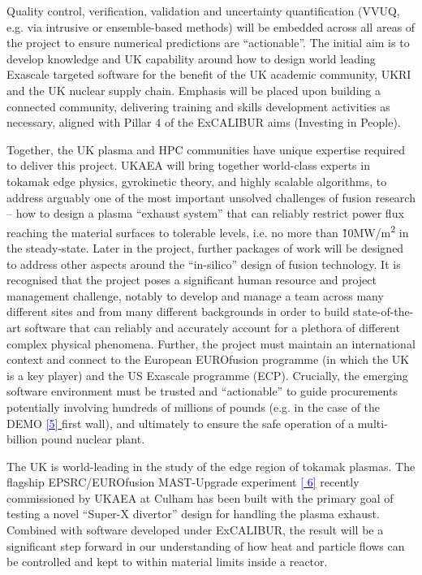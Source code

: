 \documentclass[a4paper]{article}
\newcommand\textstyleInternetlink[1]{\textcolor{blue}{#1}}
\begin{document}
\bigskip

{Quality control, verification, validation and uncertainty quantification 
(VVUQ, e.g. via intrusive or
ensemble-based methods) will be embedded across all areas of the project to 
ensure numerical predictions are
``actionable''. The initial aim is to develop knowledge and UK capability 
around how to design world leading Exascale
targeted software for the benefit of the UK academic community, UKRI and the UK 
nuclear supply chain. Emphasis will be
placed upon building a connected community, delivering training and skills 
development activities as necessary, aligned
with Pillar 4 of the ExCALIBUR aims (Investing in People).}


\bigskip

Together, the UK plasma and HPC communities have unique expertise required to 
deliver this project. UKAEA will bring
together world-class experts in tokamak edge physics, gyrokinetic theory, and 
highly scalable algorithms, to address
arguably one of the most important unsolved challenges of fusion research -- 
how to design a plasma ``exhaust system''
that can reliably restrict power flux reaching the material surfaces to 
tolerable levels, i.e. no more than
\~10MW/m\textsuperscript{2} in the steady-state. Later in the project, 
further packages of work will be designed to
address other aspects around the ``in-silico'' design of fusion technology. It 
is recognised that the project poses a
significant human resource and project management challenge, notably to develop 
and manage a team across many different
sites and from many different backgrounds in order to build state-of-the-art 
software that can reliably and accurately
account for a plethora of different complex physical phenomena. Further, the 
project must maintain an international
context and connect to the European EUROfusion programme (in which the UK is a 
key player) and the US Exascale
programme (ECP). Crucially, the emerging software environment must be trusted 
and ``actionable'' to guide procurements
potentially involving hundreds of millions of pounds (e.g. in the case of the 
{DEMO
}\href{https://www.euro-fusion.org/programme/demo/}{\textstyleInternetlink{{[5]}
}}{
first wall}), and ultimately to ensure the safe operation of a multi-billion 
pound nuclear plant.


\bigskip

The UK is world-leading in the study of the edge region of tokamak plasmas. The 
flagship EPSRC/EUROfusion MAST-Upgrade
{experiment
}\href{https://reuters.screenocean.com/record/1366443}{\textstyleInternetlink{{[
6]}}}{
recently }commissioned by UKAEA at Culham has been built with the primary goal 
of testing a novel ``Super-X divertor''
design for handling the plasma exhaust. Combined with software developed under 
ExCALIBUR, the result will be a
significant step forward in our understanding of how heat and particle flows 
can be controlled and kept to within
material limits inside a reactor.
\end{document}
